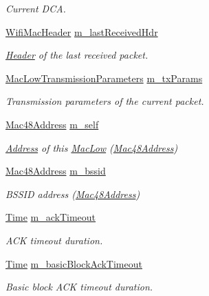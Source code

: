 \begin{DoxyCompactItemize}
\begin{DoxyCompactList}\small\item\em Current D\+CA. \end{DoxyCompactList}\item 
\hyperlink{classns3_1_1WifiMacHeader}{Wifi\+Mac\+Header} \hyperlink{classns3_1_1MacLow_aa085c0d48ba7c17138b8027666d85bb5}{m\+\_\+last\+Received\+Hdr}
\begin{DoxyCompactList}\small\item\em \hyperlink{classns3_1_1Header}{Header} of the last received packet. \end{DoxyCompactList}\item 
\hyperlink{classns3_1_1MacLowTransmissionParameters}{Mac\+Low\+Transmission\+Parameters} \hyperlink{classns3_1_1MacLow_a1c5ce6a0415d4a6d394bc9fc8f78327d}{m\+\_\+tx\+Params}
\begin{DoxyCompactList}\small\item\em Transmission parameters of the current packet. \end{DoxyCompactList}\item 
\hyperlink{classns3_1_1Mac48Address}{Mac48\+Address} \hyperlink{classns3_1_1MacLow_a23004ca5405c82111f5b20eec03b3d9a}{m\+\_\+self}
\begin{DoxyCompactList}\small\item\em \hyperlink{classns3_1_1Address}{Address} of this \hyperlink{classns3_1_1MacLow}{Mac\+Low} (\hyperlink{classns3_1_1Mac48Address}{Mac48\+Address}) \end{DoxyCompactList}\item 
\hyperlink{classns3_1_1Mac48Address}{Mac48\+Address} \hyperlink{classns3_1_1MacLow_a36761d1d6c972817b9e2361952180923}{m\+\_\+bssid}
\begin{DoxyCompactList}\small\item\em B\+S\+S\+ID address (\hyperlink{classns3_1_1Mac48Address}{Mac48\+Address}) \end{DoxyCompactList}\item 
\hyperlink{classns3_1_1Time}{Time} \hyperlink{classns3_1_1MacLow_a5889cbf3ea77554b9eb0cf1a618a2db8}{m\+\_\+ack\+Timeout}
\begin{DoxyCompactList}\small\item\em A\+CK timeout duration. \end{DoxyCompactList}\item 
\hyperlink{classns3_1_1Time}{Time} \hyperlink{classns3_1_1MacLow_a3bc501e96dd54acfcfec0dbbfeb487e7}{m\+\_\+basic\+Block\+Ack\+Timeout}
\begin{DoxyCompactList}\small\item\em Basic block A\+CK timeout duration. \end{DoxyCompactList}\item 

\end{DoxyCompactItemize}
